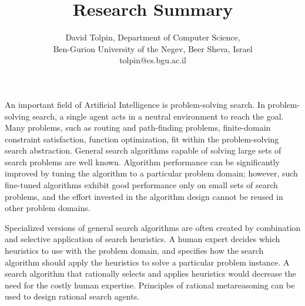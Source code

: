 \documentclass{article}
\title{Research Summary}
\author {David Tolpin,
Department of Computer Science, \\
Ben-Gurion University of the Negev, Beer Sheva, Israel \\
tolpin@cs.bgu.ac.il}
\begin{document}
\maketitle

An important field of Artificial Intelligence is
problem-solving search. In problem-solving search, a single agent acts
in a neutral environment to reach the goal. Many problems, such as
routing and path-finding problems, finite-domain constraint
satisfaction, function optimization, fit within the problem-solving
search abstraction. General search algorithms capable of solving large
sets of search problems are well known. Algorithm performance can be
significantly improved by tuning the algorithm to a particular problem
domain; however, such fine-tuned algorithms exhibit good performance
only on small sets of search problems, and the effort invested in the
algorithm design cannot be reused in other problem domains.

Specialized versions of general search algorithms are often created by
combination and selective application of search  heuristics.
A human expert decides which heuristics to use with the
problem domain, and specifies how the search algorithm should apply
the heuristics to solve a particular problem instance. A search
algorithm that rationally selects and applies heuristics would decrease
the need for the costly human expertise. Principles of rational
metareasoning can be used to design rational search agents.
\end{document}

